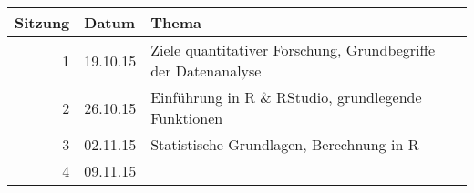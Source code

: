 \documentclass[]{article}
\renewcommand{\[}{\begin{equation}}
\renewcommand{\]}{\end{equation}}
\newcommand{\R}{\textsf{R}}
\begin{document}
\begin{longtable}[c]{@{}rll@{}}
\toprule
\begin{minipage}[b]{0.18\columnwidth}\raggedleft\strut
Sitzung
\strut\end{minipage} &
\begin{minipage}[b]{0.18\columnwidth}\raggedright\strut
Datum
\strut\end{minipage} &
\begin{minipage}[b]{0.42\columnwidth}\raggedright\strut
Thema
\strut\end{minipage}\tabularnewline
\midrule
\endhead
\begin{minipage}[t]{0.18\columnwidth}\raggedleft\strut
1
\strut\end{minipage} &
\begin{minipage}[t]{0.18\columnwidth}\raggedright\strut
19.10.15
\strut\end{minipage} &
\begin{minipage}[t]{0.42\columnwidth}\raggedright\strut
Ziele quantitativer Forschung, Grundbegriffe der Datenanalyse
\strut\end{minipage}\tabularnewline
\begin{minipage}[t]{0.18\columnwidth}\raggedleft\strut
2
\strut\end{minipage} &
\begin{minipage}[t]{0.18\columnwidth}\raggedright\strut
26.10.15
\strut\end{minipage} &
\begin{minipage}[t]{0.42\columnwidth}\raggedright\strut
Einführung in \R{} \& RStudio, grundlegende Funktionen
\strut\end{minipage}\tabularnewline
\begin{minipage}[t]{0.18\columnwidth}\raggedleft\strut
3
\strut\end{minipage} &
\begin{minipage}[t]{0.18\columnwidth}\raggedright\strut
02.11.15
\strut\end{minipage} &
\begin{minipage}[t]{0.42\columnwidth}\raggedright\strut
Statistische Grundlagen, Berechnung in \R{}
\strut\end{minipage}\tabularnewline
\begin{minipage}[t]{0.18\columnwidth}\raggedleft\strut
4
\strut\end{minipage} &
\begin{minipage}[t]{0.18\columnwidth}\raggedright\strut
09.11.15
\strut\end{minipage} &
\begin{minipage}[t]{0.42\columnwidth}\raggedright\strut

\end{minipage}
\end{longtable}
\end{document}
